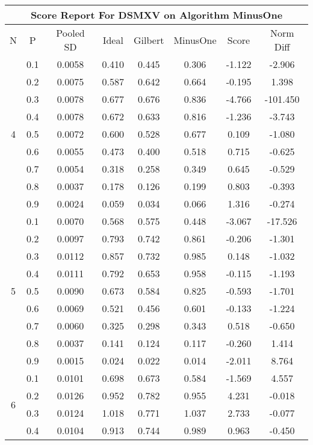 \documentclass[11pt,a4paper]{report}
\begin{document}
\begin{longtable}{ | c | c || c | c | c | c | c | c | }
\hline
\multicolumn{8}{|c|}{ Score Report For DSMXV on Algorithm MinusOne} \\
\hline
N & P & Pooled SD &  Ideal &  Gilbert & MinusOne  & Score & Norm Diff \\
 \hline
 \hline
 \endhead
\multirow{9}{*}{4} & 0.1 & 0.0058 & 0.410 & 0.445 & 0.306 & -1.122 & -2.906 \\
 & 0.2 & 0.0075 & 0.587 & 0.642 & 0.664 & -0.195 & 1.398 \\
 & 0.3 & 0.0078 & 0.677 & 0.676 & 0.836 & -4.766 & -101.450 \\
 & 0.4 & 0.0078 & 0.672 & 0.633 & 0.816 & -1.236 & -3.743 \\
 & 0.5 & 0.0072 & 0.600 & 0.528 & 0.677 & 0.109 & -1.080 \\
 & 0.6 & 0.0055 & 0.473 & 0.400 & 0.518 & 0.715 & -0.625 \\
 & 0.7 & 0.0054 & 0.318 & 0.258 & 0.349 & 0.645 & -0.529 \\
 & 0.8 & 0.0037 & 0.178 & 0.126 & 0.199 & 0.803 & -0.393 \\
 & 0.9 & 0.0024 & 0.059 & 0.034 & 0.066 & 1.316 & -0.274 \\
 \hline
\multirow{9}{*}{5} & 0.1 & 0.0070 & 0.568 & 0.575 & 0.448 & -3.067 & -17.526 \\
 & 0.2 & 0.0097 & 0.793 & 0.742 & 0.861 & -0.206 & -1.301 \\
 & 0.3 & 0.0112 & 0.857 & 0.732 & 0.985 & 0.148 & -1.032 \\
 & 0.4 & 0.0111 & 0.792 & 0.653 & 0.958 & -0.115 & -1.193 \\
 & 0.5 & 0.0090 & 0.673 & 0.584 & 0.825 & -0.593 & -1.701 \\
 & 0.6 & 0.0069 & 0.521 & 0.456 & 0.601 & -0.133 & -1.224 \\
 & 0.7 & 0.0060 & 0.325 & 0.298 & 0.343 & 0.518 & -0.650 \\
 & 0.8 & 0.0037 & 0.141 & 0.124 & 0.117 & -0.260 & 1.414 \\
 & 0.9 & 0.0015 & 0.024 & 0.022 & 0.014 & -2.011 & 8.764 \\
 \hline
\multirow{9}{*}{6} & 0.1 & 0.0101 & 0.698 & 0.673 & 0.584 & -1.569 & 4.557 \\
 & 0.2 & 0.0126 & 0.952 & 0.782 & 0.955 & 4.231 & -0.018 \\
 & 0.3 & 0.0124 & 1.018 & 0.771 & 1.037 & 2.733 & -0.077 \\
 & 0.4 & 0.0104 & 0.913 & 0.744 & 0.989 & 0.963 & -0.450 \\

\end{longtable}
\end{document}
